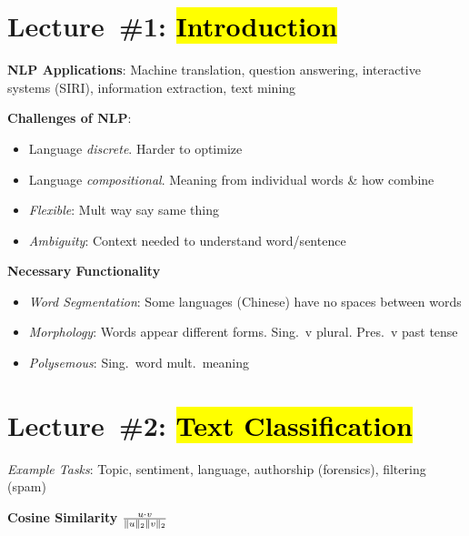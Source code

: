 \documentclass[8pt]{extarticle}
\renewcommand{\green}[1]{{\color{ForestGreen} #1}}
\newcommand{\greenbf}[1]{\textbf{\green{#1}}}
\begin{document}
\setlength{\abovedisplayskip}{0pt}
\setlength{\belowdisplayskip}{0pt}
\setlength{\abovedisplayshortskip}{0pt}
\setlength{\belowdisplayshortskip}{0pt}

\begin{multicols}{3}
  \section*{Lecture~\#1: \hl{Introduction}}

  \textbf{NLP Applications}: Machine translation, question answering, interactive systems (SIRI), information extraction, text mining

  \textbf{Challenges of NLP}:
  \begin{itemize}
    \item Language \textit{discrete}. Harder to optimize
    \item Language \textit{compositional}. Meaning from individual words \& how combine
    \item \textit{Flexible}: Mult way say same thing
    \item \textit{Ambiguity}: Context needed to understand word/sentence
  \end{itemize}

  \textbf{Necessary Functionality}
  \begin{itemize}
    \item \textit{Word Segmentation}: Some languages (Chinese) have no spaces between words
    \item \textit{Morphology}: Words appear different forms. Sing.\ v plural. Pres.\ v past tense
    \item \textit{Polysemous}: Sing.\ word mult.\ meaning
  \end{itemize}

  \section*{Lecture~\#2: \hl{Text Classification}}
  \textit{Example Tasks}: Topic, sentiment, language, authorship (forensics), filtering (spam)

  \greenbf{Cosine Similarity} $\frac{u \cdot v}{\lVert u\rVert_{2} \lVert v\rVert_{2}}$

  \subsection*{}


\end{multicols}
\end{document}

